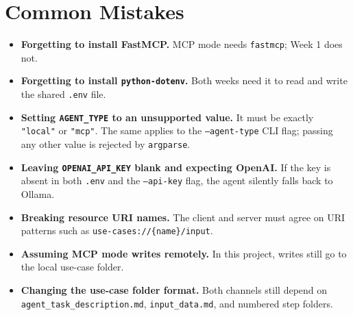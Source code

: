 \documentclass[12pt, a4paper]{article}
\begin{document}
\section{Common Mistakes}

\begin{itemize}[leftmargin=1.5em]
  \item \textbf{Forgetting to install FastMCP.} MCP mode needs \texttt{fastmcp}; Week 1 does not.
  \item \textbf{Forgetting to install \texttt{python-dotenv}.} Both weeks need it to read and write the shared \texttt{.env} file.
  \item \textbf{Setting \texttt{AGENT\_TYPE} to an unsupported value.} It must be exactly \texttt{"local"} or \texttt{"mcp"}. The same applies to the \texttt{--agent-type} CLI flag; passing any other value is rejected by \texttt{argparse}.
  \item \textbf{Leaving \texttt{OPENAI\_API\_KEY} blank and expecting OpenAI.} If the key is absent in both \texttt{.env} and the \texttt{--api-key} flag, the agent silently falls back to Ollama.
  \item \textbf{Breaking resource URI names.} The client and server must agree on URI patterns such as \texttt{use-cases://\{name\}/input}.
  \item \textbf{Assuming MCP mode writes remotely.} In this project, writes still go to the local use-case folder.
  \item \textbf{Changing the use-case folder format.} Both channels still depend on \\ \texttt{agent\_task\_description.md}, \texttt{input\_data.md}, and numbered step folders.
\end{itemize}
\end{document}
